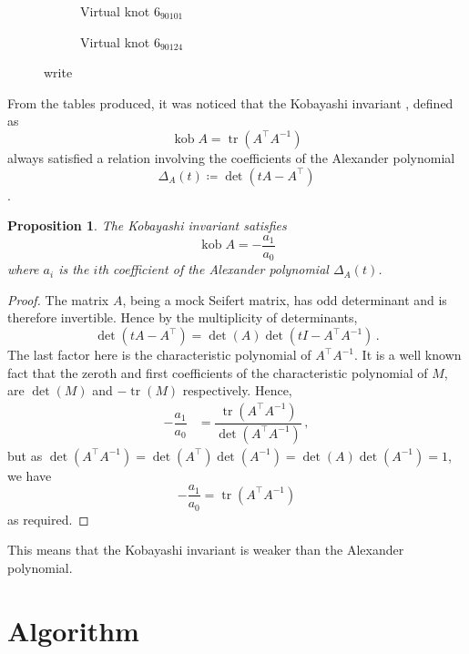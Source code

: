 \documentclass[12pt]{report}
\newcommand{\kob}{\operatorname{kob}}
\newtheorem*{proposition}{Proposition}
\begin{document}
\begin{figure}[hbt!]
	\centering
	\hspace*{\fill}
	\begin{subfigure}[b]{0.4 \textwidth}
		\centering
		\def\svgscale{0.35}
		
		\caption{Virtual knot $6_{90101}$}
		\label{fig:6-90101_vknot}
	\end{subfigure}
	\hspace*{\fill}	\hspace*{\fill}	\hspace*{\fill}
	\begin{subfigure}[b]{0.4 \textwidth}
		\centering
		\def\svgscale{0.35}
		
		\caption{Virtual knot $6_{90124}$}
		\label{fig:6-90124_vknot}
	\end{subfigure}
	\hspace*{\fill} 
	\caption{write}
	\label{fig:counterexamples}
\end{figure}

From the tables produced, it was noticed that the Kobayashi invariant \cite{new-invariant-under-congruence}, defined as
\[\kob A = \operatorname{tr}(A^{\top}A^{-1})\]
always satisfied a relation involving the coefficients of the Alexander polynomial
\[\Delta_{A}(t) \coloneq \det(tA - A^{\top})\] \cite{mock-seifert-matrices}.

\begin{proposition}
The Kobayashi invariant satisfies
\[\kob A = -\dfrac{a_{1}}{a_{0}}\]
where $a_{i}$ is the $i$th coefficient of the Alexander polynomial $\Delta_{A}(t)$.
\end{proposition}
\begin{proof}
The matrix $A$, being a mock Seifert matrix, has odd determinant \cite{mock-seifert-matrices} and is therefore invertible. Hence by the multiplicity of determinants,
\[\det(tA - A^{\top}) = \det(A)\det(tI - A^{\top}A^{-1})\,.\]
The last factor here is the characteristic polynomial of $A^{\top}A^{-1}$. It is a well known fact that the zeroth and first coefficients of the characteristic polynomial of $M$, are $\det(M)$ and $-\operatorname{tr}(M)$ respectively. Hence,
\begin{align*}
-\dfrac{a_{1}}{a_{0}}	& = \dfrac{\operatorname{tr}(A^{\top}A^{-1})}{\det(A^{\top}A^{-1})}\,,
\end{align*}
but as $\det(A^{\top}A^{-1}) = \det(A^{\top})\det(A^{-1}) = \det(A)\det(A^{-1}) = 1$, we have
\[-\dfrac{a_{1}}{a_{0}} = \operatorname{tr}(A^{\top}A^{-1})\]
as required.
\end{proof}

This means that the Kobayashi invariant is weaker than the Alexander polynomial.


\newpage
\printbibliography[title=References]


\appendix
{}
\titlespacing*{\chapter}{0pt}{40pt}{30pt}

\chapter{Algorithm}
\end{document}
